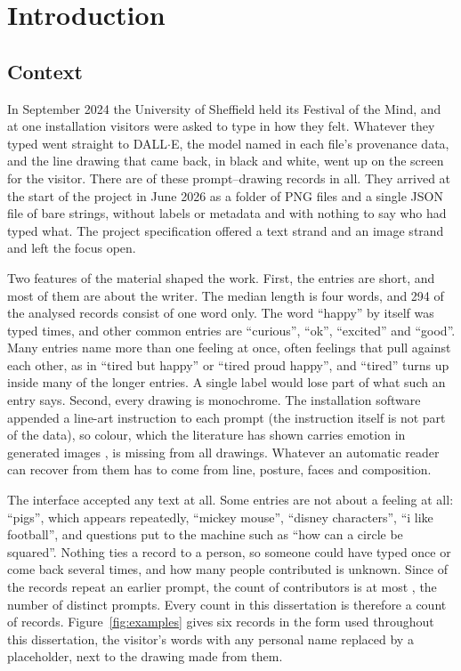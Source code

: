 \chapter{Introduction}
\label{ch:intro}

\section{Context}
\label{sec:intro-context}

In September 2024 the University of Sheffield held its Festival of the Mind, and at one installation visitors were asked to type in how they felt. Whatever they typed went straight to DALL$\cdot$E, the model named in each file's provenance data, and the line drawing that came back, in black and white, went up on the screen for the visitor. There are \nTotal{} of these prompt--drawing records in all. They arrived at the start of the project in June 2026 as a folder of PNG files and a single JSON file of bare strings, without labels or metadata and with nothing to say who had typed what. The project specification offered a text strand and an image strand and left the focus open.

Two features of the material shaped the work. First, the entries are short, and most of them are about the writer. The median length is four words, and 294 of the analysed records consist of one word only. The word ``happy'' by itself was typed \nHappy{} times, and other common entries are ``curious'', ``ok'', ``excited'' and ``good''. Many entries name more than one feeling at once, often feelings that pull against each other, as in ``tired but happy'' or ``tired proud happy'', and ``tired'' turns up inside many of the longer entries. A single label would lose part of what such an entry says. Second, every drawing is monochrome. The installation software appended a line-art instruction to each prompt (the instruction itself is not part of the data), so colour, which the literature has shown carries emotion in generated images \cite{alvarado2025texttoimage}, is missing from all \nTotal{} drawings. Whatever an automatic reader can recover from them has to come from line, posture, faces and composition.

The interface accepted any text at all. Some entries are not about a feeling at all: ``pigs'', which appears repeatedly, ``mickey mouse'', ``disney characters'', ``i like football'', and questions put to the machine such as ``how can a circle be squared''. Nothing ties a record to a person, so someone could have typed once or come back several times, and how many people contributed is unknown. Since \nRepeats{} of the \nAnalysed{} records repeat an earlier prompt, the count of contributors is at most \nDistinct{}, the number of distinct prompts. Every count in this dissertation is therefore a count of records. Figure~\ref{fig:examples} gives six records in the form used throughout this dissertation, the visitor's words with any personal name replaced by a placeholder, next to the drawing made from them.

